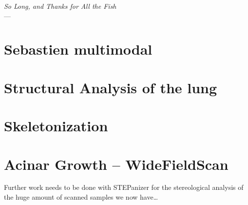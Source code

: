 \acresetall
{}\label{ch:outlook}
\begin{flushright}{\slshape    
		So Long, and Thanks for All the Fish} \\ \medskip
    ---  \citep{Adams1984}
\end{flushright}
\vspace{52mm}

\section{Sebastien multimodal}

\section{Structural Analysis of the lung}

\section{Skeletonization}


\section{Acinar Growth -- WideFieldScan}
Further work needs to be done with STEPanizer for the stereological analysis of the huge amount of scanned samples we now have\ldots